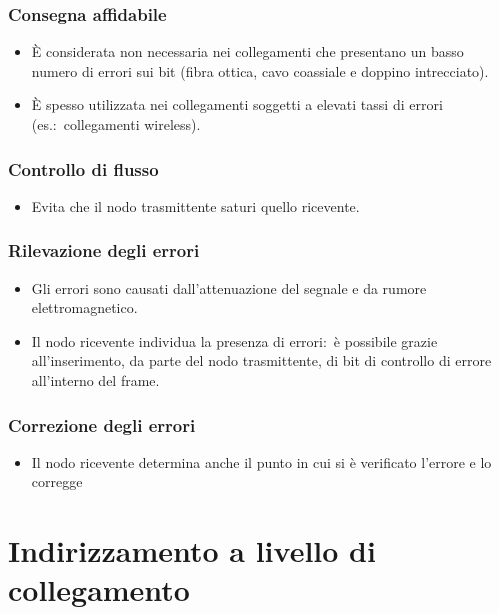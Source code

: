 \subsubsection{Consegna affidabile}

\begin{itemize}
    \item È considerata non necessaria nei collegamenti che presentano un basso numero di errori sui bit (fibra ottica, cavo coassiale e doppino intrecciato).
    \item È spesso utilizzata nei collegamenti soggetti a elevati tassi di errori (es.:\ collegamenti wireless).
\end{itemize}

\subsubsection{Controllo di flusso}

\begin{itemize}
    \item Evita che il nodo trasmittente saturi quello ricevente.
\end{itemize}

\subsubsection{Rilevazione degli errori}

\begin{itemize}
    \item Gli errori sono causati dall’attenuazione del segnale e da rumore elettromagnetico.
    \item Il nodo ricevente individua la presenza di errori:\ è possibile grazie all’inserimento, da parte del nodo trasmittente, di bit di controllo di errore all’interno del frame.
\end{itemize}

\subsubsection{Correzione degli errori}

\begin{itemize}
    \item Il nodo ricevente determina anche il punto in cui si è verificato l’errore e lo corregge
\end{itemize}

\section{Indirizzamento a livello di collegamento}

